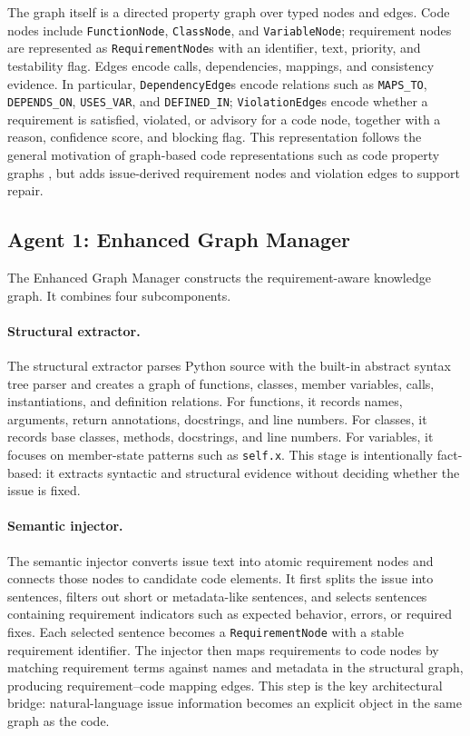 \documentclass[11pt]{article}
\begin{document}
The graph itself is a directed property graph over typed nodes and edges.  Code nodes include \texttt{FunctionNode}, \texttt{ClassNode}, and \texttt{VariableNode}; requirement nodes are represented as \texttt{RequirementNode}s with an identifier, text, priority, and testability flag.  Edges encode calls, dependencies, mappings, and consistency evidence.  In particular, \texttt{DependencyEdge}s encode relations such as \texttt{MAPS\_TO}, \texttt{DEPENDS\_ON}, \texttt{USES\_VAR}, and \texttt{DEFINED\_IN}; \texttt{ViolationEdge}s encode whether a requirement is satisfied, violated, or advisory for a code node, together with a reason, confidence score, and blocking flag.  This representation follows the general motivation of graph-based code representations such as code property graphs \citep{yamaguchi-etal-2014-code-property-graphs}, but adds issue-derived requirement nodes and violation edges to support repair.

\subsection{Agent 1: Enhanced Graph Manager}
\label{subsec:graph-manager}

The Enhanced Graph Manager constructs the requirement-aware knowledge graph.  It combines four subcomponents.

\paragraph{Structural extractor.}
The structural extractor parses Python source with the built-in abstract syntax tree parser and creates a graph of functions, classes, member variables, calls, instantiations, and definition relations.  For functions, it records names, arguments, return annotations, docstrings, and line numbers.  For classes, it records base classes, methods, docstrings, and line numbers.  For variables, it focuses on member-state patterns such as \texttt{self.x}.  This stage is intentionally fact-based: it extracts syntactic and structural evidence without deciding whether the issue is fixed.

\paragraph{Semantic injector.}
The semantic injector converts issue text into atomic requirement nodes and connects those nodes to candidate code elements.  It first splits the issue into sentences, filters out short or metadata-like sentences, and selects sentences containing requirement indicators such as expected behavior, errors, or required fixes.  Each selected sentence becomes a \texttt{RequirementNode} with a stable requirement identifier.  The injector then maps requirements to code nodes by matching requirement terms against names and metadata in the structural graph, producing requirement--code mapping edges.  This step is the key architectural bridge: natural-language issue information becomes an explicit object in the same graph as the code.
\end{document}
